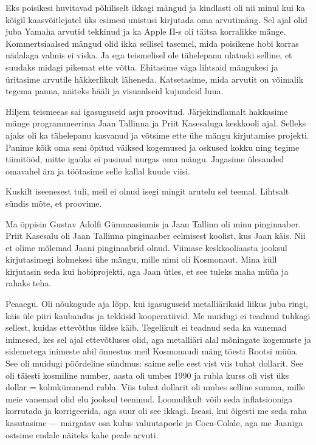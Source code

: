 
Eks poisikesi huvitavad põhiliselt ikkagi mängud ja kindlasti oli nii minul  
kui ka kõigil kaasvõitlejatel üks esimesi unistusi 
kirjutada oma arvutimäng. Sel ajal olid juba  
Yamaha arvutid tekkinud ja ka Apple II-s oli täitsa 
korralikke mänge. Kommertsiaalsed mängud olid ikka sellisel 
tasemel, mida poisikene hobi korras nädalaga valmis ei viska. Ja 
ega teismelisel ole tähelepanu ulatuski 
selline, et suudaks midagi pikemat ette võtta. Ehitasime väga 
lihtsaid mängukesi ja üritasime arvutile 
häkkerlikult läheneda. Katsetasime, mida arvutit on 
võimalik tegema panna, näiteks hääli ja visuaalseid kujundeid luua. 

Hiljem teismeeas sai igasuguseid asju proovitud. Järjekindlamalt 
hakkasime mänge programmeerima Jaan Tallinna ja Priit 
Kasesaluga keskkooli ajal. Selleks ajaks oli 
ka tähelepanu 
kasvanud ja võtsime ette ühe mängu kirjutamise projekti. Panime kõik oma seni 
õpitud väiksed kogemused 
ja oskused kokku ning tegime tiimitööd, mitte igaüks ei pusinud nurgas oma 
mängu. Jagasime 
ülesanded omavahel ära ja töötasime selle kallal kuude viisi. 


Kuskilt iseenesest tuli, meil ei olnud isegi
mingit arutelu sel teemal. Lihtsalt sündis mõte, et proovime. 


Ma õppisin Gustav Adolfi Gümnaasiumis
ja Jaan Tallinn oli minu pinginaaber. Priit 
Kasesalu oli Jaan Tallinna pinginaaber eelmisest 
koolist, kus Jaan käis. Nii et olime mõlemad Jaani pinginaabrid olnud. Viimase 
keskkooliaasta jooksul kirjutasimegi kolmekesi ühe mängu, 
mille nimi oli Kosmonaut. Mina küll  
kirjutasin seda kui hobiprojekti, aga Jaan ütles, et see tuleks maha müüa ja 
rahaks teha. 


Peaaegu. Oli nõukogude aja lõpp, kui igasuguseid 
metalliärikaid liikus juba ringi, käis üle piiri  
kaubandus ja tekkisid kooperatiivid. Me 
muidugi ei teadnud tuhkagi sellest, kuidas ettevõtlus 
üldse käib. Tegelikult ei teadnud seda ka vanemad inimesed, kes sel 
ajal ettevõtluses olid, aga metalliäri alal 
mõningate kogemuste ja 
sidemetega inimeste abil õnnestus meil Kosmonaudi mäng tõesti Rootsi müüa. 
See oli muidugi pöördeline sündmus: saime selle eest 
vist viis tuhat 
dollarit. See oli täiesti kosmiline number, aasta oli umbes 1990 ja rubla 
kurss oli vist üks dollar = kolmkümmend rubla. Viis tuhat dollarit 
oli umbes selline summa, mille meie vanemad olid elu jooksul teeninud. 
Loomulikult võib seda inflatsiooniga korrutada ja 
korrigeerida, aga suur oli see ikkagi. Iseasi, kui õigesti me seda raha 
kasutasime --- märgatav osa kulus 
valuutapoele ja Coca-Colale, aga me Jaaniga ostsime endale näiteks kahe 
peale arvuti. 

